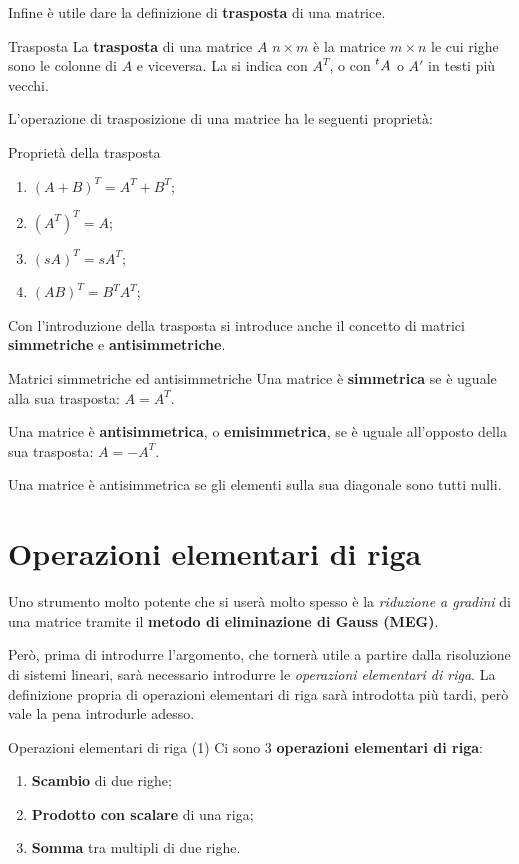 Infine è utile dare la definizione di \textbf{trasposta} di una matrice.
\begin{newdef}{Trasposta}
    La \textbf{trasposta} di una matrice $A$ $n \times m$ è la matrice $m \times n$ le cui righe sono le colonne di $A$ e viceversa. La si indica con $A^T$, o con $\prescript{t}{}{A}$ o $A'$ in testi più vecchi.
\end{newdef}
L'operazione di trasposizione di una matrice ha le seguenti proprietà:
\begin{teo}{Proprietà della trasposta}
    \begin{enumerate}
        \item $(A + B)^T = A^T + B^T$;
        \item $(A^T)^T = A$;
        \item $(sA)^T = sA^T$;
        \item $(AB)^T = B^T A^T$;
    \end{enumerate}
\end{teo}
Con l'introduzione della trasposta si introduce anche il concetto di matrici \textbf{simmetriche} e \textbf{antisimmetriche}.
\begin{newdef}{Matrici simmetriche ed antisimmetriche}
    Una matrice è \textbf{simmetrica} se è uguale alla sua trasposta: $A = A^T$.

    Una matrice è \textbf{antisimmetrica}, o \textbf{emisimmetrica}, se è uguale all'opposto della sua trasposta: $A = -A^T$.
\end{newdef}
\begin{nb}
    Una matrice è antisimmetrica se gli elementi sulla sua diagonale sono tutti nulli.
\end{nb}

\section{Operazioni elementari di riga}
Uno strumento molto potente che si userà molto spesso è la \textit{riduzione a gradini} di una matrice tramite il \textbf{metodo di eliminazione di Gauss (MEG)}.

Però, prima di introdurre l'argomento, che tornerà utile a partire dalla risoluzione di sistemi lineari, sarà necessario introdurre le \textit{operazioni elementari di riga}. La definizione propria di operazioni elementari di riga sarà introdotta più tardi, però vale la pena introdurle adesso.
\begin{newdef}{Operazioni elementari di riga (1)}
    Ci sono 3 \textbf{operazioni elementari di riga}:
    \begin{enumerate}
        \item \textbf{Scambio} di due righe;
        \item \textbf{Prodotto con scalare} di una riga;
        \item \textbf{Somma} tra multipli di due righe.
    \end{enumerate}
\end{newdef}